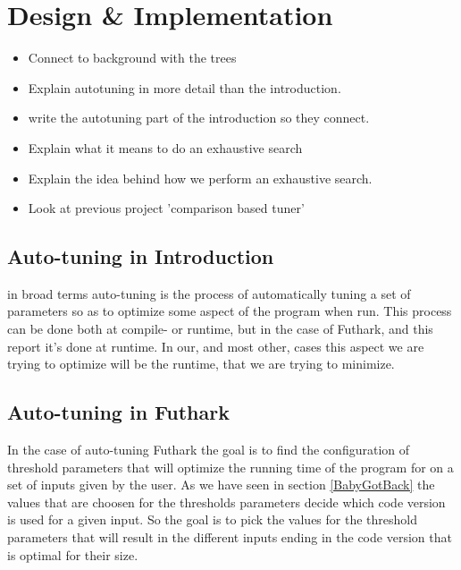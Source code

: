 \section{Design \& Implementation}

\begin{itemize}
  \item Connect to background with the trees
  \item Explain autotuning in more detail than the introduction.
    \item write the autotuning part of the introduction so they connect.
  \item Explain what it means to do an exhaustive search
  \item Explain the idea behind how we perform an exhaustive search.
    \item Look at previous project 'comparison based tuner'
\end{itemize}
\subsection{Auto-tuning in Introduction}
in broad terms auto-tuning is the process of automatically tuning a set of
parameters so as to optimize some aspect of the program when run. This
process can be done both at compile- or runtime, but in the case of Futhark,
and this report it's done at runtime. In our, and most other, cases this aspect
we are trying to optimize will be the runtime, that we are trying to minimize. 


\subsection{Auto-tuning in Futhark} %
In the case of auto-tuning Futhark the goal is to find the configuration of 
threshold parameters that will optimize the running time of the program for 
on a set of inputs given by the user. As we have seen in section \ref{BabyGotBack}
the values that are choosen for the thresholds parameters decide which code
version is used for a given input. So the goal is to pick the values for the
threshold parameters that will result in the different inputs ending in the
code version that is optimal for their size.

